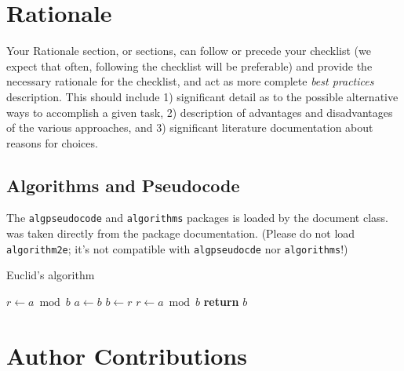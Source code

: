 \documentclass[9pt,bestpractices]{livecoms}
\begin{document}
\section{Rationale}

Your Rationale section, or sections, can follow or precede your checklist (we expect that often, following the checklist will be preferable) and provide the necessary rationale for the checklist, and act as more complete \emph{best practices} description.
This should include 1) significant detail as to the possible alternative ways to accomplish a given task, 2) description of advantages and disadvantages of the various approaches, and 3) significant literature documentation about reasons for choices.

\subsection{Algorithms and Pseudocode}
\label{sec:reference_this}

The \texttt{algpseudocode} and \texttt{algorithms} packages is loaded by the document class.  was taken directly from the package documentation. (Please do not load \texttt{algorithm2e}; it's not compatible with \texttt{algpseudocde} nor \texttt{algorithms}!)

\begin{algorithm}
\caption{Euclid's algorithm}\label{alg:euclid}
\begin{algorithmic}%
   \State $r\gets a\bmod b$
      \State $a\gets b$
      \State $b\gets r$
      \State $r\gets a\bmod b$
   \EndWhile\label{euclidendwhile}
   \State \textbf{return} $b$
\EndProcedure
\end{algorithmic}
\end{algorithm}





\section{Author Contributions}
%
\end{document}

